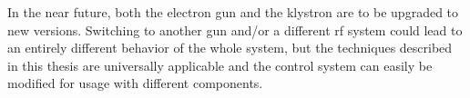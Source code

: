 In the near future, both the electron gun and the klystron are to be upgraded to new versions. Switching to another gun and/or a different \gls{rf} system could lead to an entirely different behavior of the whole system, but the techniques described in this thesis are universally applicable and the control system can easily be modified for usage with different components.